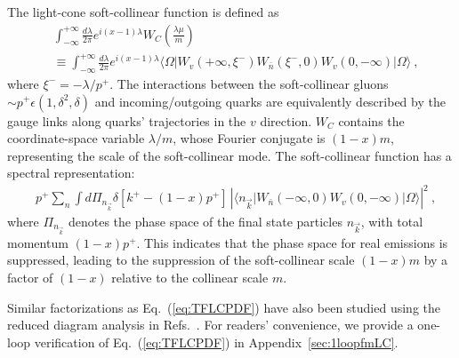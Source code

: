 \documentclass[a4paper,11pt]{article}
\begin{document}
The light-cone soft-collinear function is defined as
\begin{align}\label{eq:LCsoft}
&\int_{-\infty}^{+\infty} \frac{d \lambda}{2 \pi} e^{i (x-1) \lambda} W_C\left(\frac{\lambda \mu}{m}\right) \nonumber\\
&\equiv \int_{-\infty}^{+\infty} \frac{d \lambda}{2 \pi} e^{i (x-1) \lambda} \langle \Omega |  W_{v}(+\infty,\xi^{-}) W_{\bar{n}}(\xi^{-},0) W_{v}(0,-\infty) | \Omega \rangle \ ,
\end{align}
where $\xi^{-} = -\lambda/p^{+}$. The interactions between the soft-collinear gluons $\sim p^+ \epsilon \left(1, \delta^2, \delta \right)$ and incoming/outgoing quarks are equivalently described by the gauge links along quarks' trajectories in the $v$ direction. $W_C$ contains the coordinate-space variable $\lambda/m$, whose Fourier conjugate is $(1-x)m$, representing the scale of the soft-collinear mode. The soft-collinear function has a spectral representation:
\begin{align}
&p^{+} \sum_{n}\int d\Pi_{n_{\vec{k}}} \delta\left[k^{+}-(1-x)p^{+}\right] \, \left| \langle n_{\vec{k}}| W_{\bar{n}}(-\infty,0) W_{v}(0,-\infty) | \Omega \rangle \right|^2 \ ,
\end{align}
where $\Pi_{n_{\vec{k}}}$ denotes the phase space of the final state particles $n_{\vec{k}}$, with total momentum $(1-x)p^{+}$. This indicates that the phase space for real emissions is suppressed, leading to the suppression of the soft-collinear scale $(1-x) m$ by a factor of $(1-x)$ relative to the collinear scale $m$.  

Similar factorizations as Eq.~(\ref{eq:TFLCPDF}) have also been studied using the reduced diagram analysis in Refs.~\cite{Korchemsky:1988si,Berger:2002sv,Ji:2004hz}. For readers' convenience, we provide a one-loop verification of Eq.~(\ref{eq:TFLCPDF}) in Appendix~\ref{sec:1loopfmLC}. 
\end{document}

